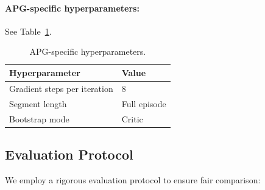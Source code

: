 \documentclass[11pt,a4paper]{article}
\begin{document}
\paragraph{APG-specific hyperparameters:} See Table~\ref{tab:apg_hp}.

\begin{table}[htbp]
  \centering
  \caption{APG-specific hyperparameters.}
  \label{tab:apg_hp}
  \begin{tabular}{@{}ll@{}}
    \toprule
    \textbf{Hyperparameter} & \textbf{Value} \\
    \midrule
    Gradient steps per iteration   & 8 \\
    Segment length                 & Full episode \\
    Bootstrap mode                 & Critic \\
    \bottomrule
  \end{tabular}
\end{table}

\subsection{Evaluation Protocol}
\label{sec:eval_protocol}

We employ a rigorous evaluation protocol to ensure fair comparison:
\end{document}
